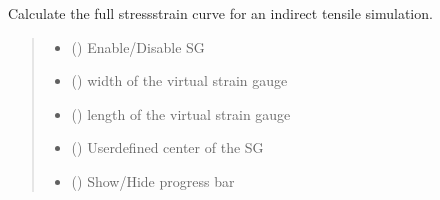 \documentclass[letterpaper,10pt,english]{sphinxmanual}
\begin{document}
\begin{fulllineitems}
\begin{fulllineitems}
\label{\detokenize{openfdem:openfdem.openfdem.Model.complete_BD_stress_strain}}
\pysigstartsignatures
{}
\pysigstopsignatures
\sphinxAtStartPar
Calculate the full stress\sphinxhyphen{}strain curve for an indirect tensile simulation.
\begin{quote}\begin{description}
\begin{itemize}
\item {} 
\sphinxAtStartPar
{} () \textendash{} Enable/Disable SG

\item {} 
\sphinxAtStartPar
{} () \textendash{} width of the virtual strain gauge

\item {} 
\sphinxAtStartPar
{} () \textendash{} length of the virtual strain gauge

\item {} 
\sphinxAtStartPar
{} (\sphinxstyleliteralemphasis{\sphinxupquote{{[}}}\sphinxstyleliteralemphasis{\sphinxupquote{, }}\sphinxstyleliteralemphasis{\sphinxupquote{, }}\sphinxstyleliteralemphasis{\sphinxupquote{{]}}}) \textendash{} User\sphinxhyphen{}defined center of the SG

\item {} 
\sphinxAtStartPar
{} () \textendash{} Show/Hide progress bar


\end{itemize}
\end{description}
\end{quote}
\end{fulllineitems}
\end{fulllineitems}
\end{document}

